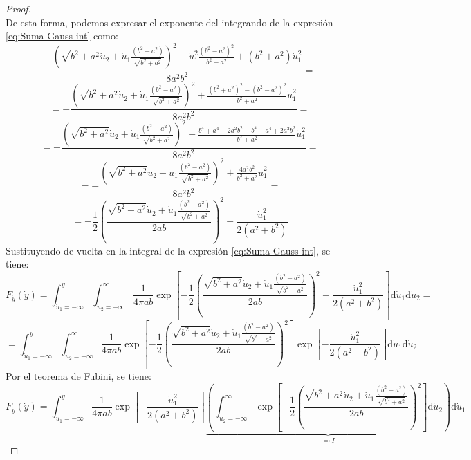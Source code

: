 \documentclass[11pt,a4paper,spanish]{article}
\numberwithin{equation}{section}
\numberwithin{table}{section}
\numberwithin{figure}{section}
\theoremstyle{definition}
\theoremstyle{remark}
\theoremstyle{definition}
\theoremstyle{remark}
\theoremstyle{plain}
\theoremstyle{plain}
\theoremstyle{plain}
\theoremstyle{plain}
\theoremstyle{plain}
\theoremstyle{plain}
\begin{document}
\begin{proof}
\[		\]
		De esta forma, podemos expresar el exponente del integrando de la
		expresión \vref{eq:Suma Gauss int} como:
		\[
		-\frac{\left(\sqrt{b^{2}+a^{2}}\dot{u}_{2}+\dot{u}_{1}\frac{\left(b^{2}-a^{2}\right)}{\sqrt{b^{2}+a^{2}}}\right)^{2}-\dot{u}_{1}^{2}\frac{\left(b^{2}-a^{2}\right)^{2}}{b^{2}+a^{2}}+\left(b^{2}+a^{2}\right)\dot{u}_{1}^{2}}{8a^{2}b^{2}}=
		\]
		\[
		=-\frac{\left(\sqrt{b^{2}+a^{2}}\dot{u}_{2}+\dot{u}_{1}\frac{\left(b^{2}-a^{2}\right)}{\sqrt{b^{2}+a^{2}}}\right)^{2}+\frac{\left(b^{2}+a^{2}\right)^{2}-\left(b^{2}-a^{2}\right)^{2}}{b^{2}+a^{2}}\dot{u}_{1}^{2}}{8a^{2}b^{2}}=
		\]
		\[
		=-\frac{\left(\sqrt{b^{2}+a^{2}}\dot{u}_{2}+\dot{u}_{1}\frac{\left(b^{2}-a^{2}\right)}{\sqrt{b^{2}+a^{2}}}\right)^{2}+\frac{b^{4}+a^{4}+2a^{2}b^{2}-b^{4}-a^{4}+2a^{2}b^{2}}{b^{2}+a^{2}}\dot{u}_{1}^{2}}{8a^{2}b^{2}}=
		\]
		\[
		=-\frac{\left(\sqrt{b^{2}+a^{2}}\dot{u}_{2}+\dot{u}_{1}\frac{\left(b^{2}-a^{2}\right)}{\sqrt{b^{2}+a^{2}}}\right)^{2}+\frac{4a^{2}b^{2}}{b^{2}+a^{2}}\dot{u}_{1}^{2}}{8a^{2}b^{2}}=
		\]
		\[
		=-\frac{1}{2}\left(\frac{\sqrt{b^{2}+a^{2}}\dot{u}_{2}+\dot{u}_{1}\frac{\left(b^{2}-a^{2}\right)}{\sqrt{b^{2}+a^{2}}}}{2ab}\right)^{2}-\frac{\dot{u}_{1}^{2}}{2\left(a^{2}+b^{2}\right)}
		\]
		Sustituyendo de vuelta en la integral de la expresión \vref{eq:Suma Gauss int},
		se tiene:
		\[
		F_{\mathring{y}}\left(\dot{y}\right)=\int_{\dot{u}_{1}=-\infty}^{\dot{y}}\int_{\dot{u}_{2}=-\infty}^{\infty}\frac{1}{4\pi ab}\exp\left[-\frac{1}{2}\left(\frac{\sqrt{b^{2}+a^{2}}\dot{u}_{2}+\dot{u}_{1}\frac{\left(b^{2}-a^{2}\right)}{\sqrt{b^{2}+a^{2}}}}{2ab}\right)^{2}-\frac{\dot{u}_{1}^{2}}{2\left(a^{2}+b^{2}\right)}\right]\mathrm{d}\dot{u}_{1}\mathrm{d}\dot{u}_{2}=
		\]
		\[
		=\int_{\dot{u}_{1}=-\infty}^{\dot{y}}\int_{\dot{u}_{2}=-\infty}^{\infty}\frac{1}{4\pi ab}\exp\left[-\frac{1}{2}\left(\frac{\sqrt{b^{2}+a^{2}}\dot{u}_{2}+\dot{u}_{1}\frac{\left(b^{2}-a^{2}\right)}{\sqrt{b^{2}+a^{2}}}}{2ab}\right)^{2}\right]\exp\left[-\frac{\dot{u}_{1}^{2}}{2\left(a^{2}+b^{2}\right)}\right]\mathrm{d}\dot{u}_{1}\mathrm{d}\dot{u}_{2}
		\]
		Por el teorema de Fubini, se tiene:
		\begin{equation}
			F_{\mathring{y}}\left(\dot{y}\right)=\int_{\dot{u}_{1}=-\infty}^{\dot{y}}\frac{1}{4\pi ab}\exp\left[-\frac{\dot{u}_{1}^{2}}{2\left(a^{2}+b^{2}\right)}\right]\underbrace{\left(\int_{\dot{u}_{2}=-\infty}^{\infty}\exp\left[-\frac{1}{2}\left(\frac{\sqrt{b^{2}+a^{2}}\dot{u}_{2}+\dot{u}_{1}\frac{\left(b^{2}-a^{2}\right)}{\sqrt{b^{2}+a^{2}}}}{2ab}\right)^{2}\right]\mathrm{d}\dot{u}_{2}\right)}_{\eqqcolon I}\mathrm{d}\dot{u}_{1}\label{eq:Gauss suma int 2}

\end{equation}
\end{proof}
\end{document}
